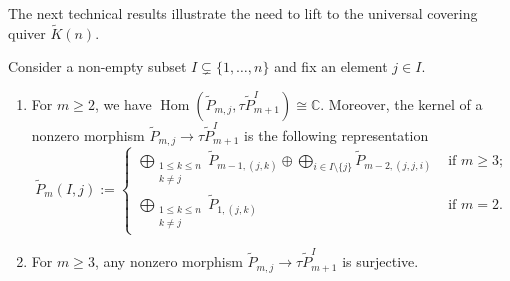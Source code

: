 \documentclass[smallextended,envcountsect,envcountsame]{svjour3}
\numberwithin{equation}{section}
\newcommand{\CC}{\mathbb{C}}
\newcommand{\Hom}{\operatorname{Hom}}
\begin{document}
The next technical results illustrate the need to lift to the universal covering quiver $\widetilde K(n)$.
\begin{lemma}
  \label{le:special subrepresentations}
  Consider a non-empty subset $I\subsetneq\{1,\ldots,n\}$ and fix an element $j\in I$. 
  \begin{enumerate}
    \item For $m\ge2$, we have $\Hom(\tilde P_{m,j},\tau\tilde P_{m+1}^I)\cong\CC$.
      Moreover, the kernel of a nonzero morphism $\tilde P_{m,j}\to\tau\tilde P_{m+1}^I$ is the following representation 
      \[\tilde P_m(I,j):=
        \begin{cases}
          \bigoplus_{\substack{1\leq k\leq n\\k\neq j}}\tilde P_{m-1,(j,k)}\oplus \bigoplus_{i\in I\setminus\{j\}}\tilde P_{m-2,(j,j,i)} & \text{ if $m\geq 3$;}\\
          \bigoplus_{\substack{1\leq k\leq n\\k\neq j}}\tilde P_{1,(j,k)} & \text{ if $m=2$.}
        \end{cases}\]
    \item For $m\ge3$, any nonzero morphism $\tilde P_{m,j}\to\tau\tilde P_{m+1}^I$ is surjective.
  \end{enumerate}
\end{lemma}
\end{document}
